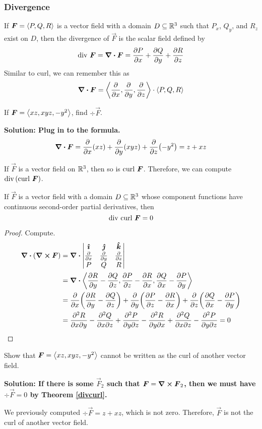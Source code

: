 \subsubsection{Divergence}
If $\boldsymbol{F} = \left\langle P,Q,R\right\rangle$ is a vector field with a domain $D\subseteq\mathbb{R}^3$ such that $P_x$, $Q_y$, and $R_z$ exist on $D$, then the divergence of $\vec F$ is the scalar field defined by
\[ \operatorname{div}\, \boldsymbol{F} = \div \boldsymbol{F} = \pdv{P}{x} + \pdv{Q}{y}+\pdv{R}{z} \]
Similar to curl, we can remember this as
\[ \div \boldsymbol{F} = \left\langle\pdv{}{x}, \pdv{}{y}, \pdv{}{z}\right\rangle \cdot \left\langle P,Q,R\right\rangle\]
\begin{example}
    If $\boldsymbol{F} = \left\langle xz, xyz, -y^2\right\rangle$, find $\div\vec F$.\par
    \bf{Solution:} Plug in to the formula.
    \begin{align*}
        \div \boldsymbol{F} = \pdv{x}(xz) + \pdv{y}(xyz) + \pdv{z}(-y^2) = z+xz
    \end{align*}
\end{example}
If $\vec F$ is a vector field on $\mathbb{R}^3$, then so is $\operatorname{curl}\,\boldsymbol{F}$. Therefore, we can compute $\operatorname{div}\,(\operatorname{curl}\, \boldsymbol{F})$.
\begin{theorem}
\label{divcurl}
    If $\vec F$ is a vector field with a domain $D\subseteq\mathbb{R}^3$ whose component functions have continuous second-order partial derivatives, then
    \[ \operatorname{div}\, \operatorname{curl}\,\boldsymbol{F} = 0\]
\end{theorem}
\begin{proof}
    Compute.
    \begin{align*}
        \div(\curl \vec F) &= \div \curlmatrix{P}{Q}{R} \\
        &= \div \< \pdv{R}{y} - \pdv{Q}{z}, \pdv{P}{z} - \pdv{R}{x}, \pdv{Q}{x} - \pdv{P}{y}\> \\
        &= \pdv{x}\pqty{\pdv{R}{y} - \pdv{Q}{z}} + \pdv{y}\pqty{\pdv{P}{z} - \pdv{R}{x}} + \pdv{z}\pqty{\pdv{Q}{x} - \pdv{P}{y}} \\
        &= \pdvv{R}{x}{y} - \pdvv{Q}{x}{z} + \pdvv{P}{y}{z} - \pdvv{R}{y}{x} + \pdvv{Q}{x}{z} - \pdvv{P}{y}{z} = 0
    \end{align*}
\end{proof}
\begin{example}
    Show that $\boldsymbol{F} = \left\langle xz, xyz, -y^2\right\rangle$ cannot be written as the curl of another vector field.\par
    \bf{Solution:} If there is some $\vec F_2$ such that $\boldsymbol{F} = \curl\boldsymbol{F}_2$, then we must have $\div \vec F = 0$ by Theorem \ref{divcurl}. \par
    We previously computed $\div \vec F = z + xz$, which is not zero. Therefore, $\vec F$ is not the curl of another vector field.
\end{example}
